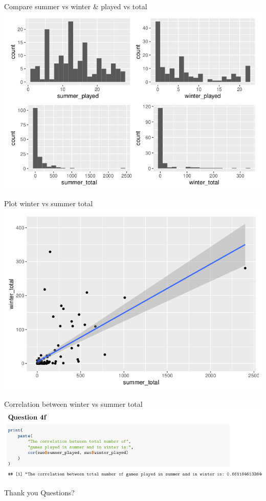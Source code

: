 \documentclass{beamer}
\begin{document}
\begin{frame}{Compare summer vs winter \& played vs total}
    \includegraphics[width=.9\textwidth]{img/ex3_screenshot05.png}
\end{frame}

\begin{frame}{Plot winter vs summer total}
    \includegraphics[width=.8\textwidth]{img/ex3_screenshot06.png}
\end{frame}

\begin{frame}{Correlation between winter vs summer total}
    \includegraphics[width=\textwidth]{img/ex3_screenshot07.png}
\end{frame}

\begin{frame}[standout]
    Thank you
    \vfill
    Questions?
\end{frame}
\end{document}
